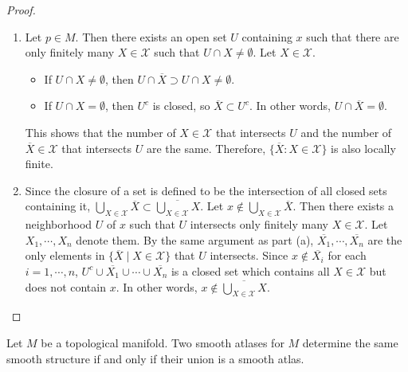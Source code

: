 \begin{proof}
  $ $
  \begin{enumerate}[label=(\alph*)]
    \item
      Let $p \in M$.
      Then there exists an open set $U$ containing $x$ such that there are only finitely many $X \in \mathcal{X}$ such that $U \cap X \ne \emptyset$.
      Let $X \in \mathcal{X}$.
      \begin{itemize}
        \item
          If $U \cap X \ne \emptyset$, then $U \cap \overline{X} \supset U \cap X \ne \emptyset$.
        \item
          If $U \cap X = \emptyset$, then $U^c$ is closed, so $\overline{X} \subset U^c$.
          In other words, $U \cap \overline{X} = \emptyset$.
      \end{itemize}
      This shows that the number of $X \in \mathcal{X}$ that intersects $U$ and the number of $\overline{X} \in \mathcal{X}$ that intersects $U$ are the same.
      Therefore, $\{ \overline{X} : X \in \mathcal{X} \}$ is also locally finite.
    \item
      Since the closure of a set is defined to be the intersection of all closed sets containing it, $\bigcup_{X \in \mathcal{X}} \overline{X} \subset \overline{\bigcup_{X \in \mathcal{X}} X}$.
      Let $x \notin \bigcup_{X \in \mathcal{X}} \overline{X}$.
      Then there exists a neighborhood $U$ of $x$ such that $U$ intersects only finitely many $X \in \mathcal{X}$.
      Let $X_1, \cdots, X_n$ denote them.
      By the same argument as part (a), $\overline{X_1}, \cdots, \overline{X_n}$ are the only elements in $\{ \overline{X} \mid X \in \mathcal{X} \}$ that $U$ intersects.
      Since $x \notin \overline{X_i}$ for each $i = 1, \cdots, n$, $U^c \cup \overline{X_1} \cup \cdots \cup \overline{X_n}$ is a closed set which contains all $X \in \mathcal{X}$ but does not contain $x$.
      In other words, $x \notin \overline{\bigcup_{X \in \mathcal{X}} X}$.
  \end{enumerate}
\end{proof}

\begin{customexer}{1.18}
  Let $M$ be a topological manifold.
  Two smooth atlases for $M$ determine the same smooth structure if and only if their union is a smooth atlas.
\end{customexer}

